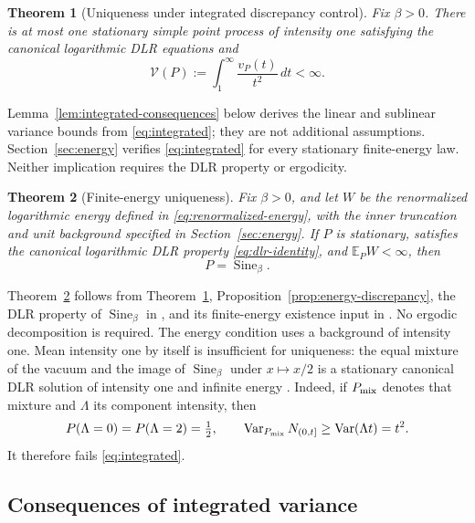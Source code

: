 \documentclass[11pt,reqno]{amsart}
\numberwithin{equation}{section}
\newtheorem{theorem}{Theorem}[section]
\theoremstyle{definition}
\theoremstyle{remark}
\newcommand{\E}{\mathbb E}
\newcommand{\1}{\mathbf 1}
\newcommand{\Var}{\operatorname{Var}}
\newcommand{\Sine}{\operatorname{Sine}}
\newcommand{\dd}{\,d}
\begin{document}
\begin{samepage}
\begin{theorem}[Uniqueness under integrated discrepancy control]
\label{thm:comparison}
Fix $\beta>0$. There is at most one stationary simple point process of
intensity one satisfying the canonical logarithmic DLR equations and
\begin{equation}\label{eq:integrated}
\mathcal V(P):=\int_1^\infty\frac{v_P(t)}{t^2}\dd t<\infty.
\end{equation}
\end{theorem}
\end{samepage}

Lemma~\ref{lem:integrated-consequences} below derives the linear and
sublinear variance bounds from \eqref{eq:integrated}; they are not
additional assumptions. Section~\ref{sec:energy} verifies
\eqref{eq:integrated} for every stationary finite-energy law.
Neither implication requires the DLR property or ergodicity.

\begin{samepage}
\begin{theorem}[Finite-energy uniqueness]\label{thm:finite-energy}
Fix $\beta>0$, and let $W$ be the renormalized logarithmic energy
defined in \eqref{eq:renormalized-energy}, with the inner truncation and
unit background specified in Section~\ref{sec:energy}.
If $P$ is stationary, satisfies the canonical logarithmic DLR
property \eqref{eq:dlr-identity}, and $\E_P W<\infty$, then
\[
P=\Sine_\beta.
\]
\end{theorem}
\end{samepage}

Theorem~\ref{thm:finite-energy} follows from
Theorem~\ref{thm:comparison}, Proposition~\ref{prop:energy-discrepancy},
the DLR property of $\Sine_\beta$ in \cite[Theorem~2.1]{DHLM}, and its
finite-energy existence input in \cite[Corollary~1.2]{LS}.
No ergodic decomposition is required.
The energy condition uses a background of intensity one. Mean intensity
one by itself is insufficient for uniqueness: the equal mixture of the
vacuum and the image of $\Sine_\beta$ under $x\mapsto x/2$ is a
stationary canonical DLR solution of intensity one and infinite energy
\cite[Proposition~9.4]{Assiotis}. Indeed, if $P_{\rm mix}$ denotes that mixture and $\Lambda$ its
component intensity, then
\[
P(\Lambda=0)=P(\Lambda=2)=\tfrac12,\qquad
\Var_{P_{\rm mix}}N_{(0,t]}
\ge\Var(\Lambda t)=t^2.
\]
It therefore fails \eqref{eq:integrated}.

\subsection{Consequences of integrated variance}
\end{document}
